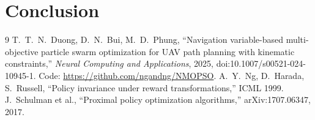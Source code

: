 \documentclass[conference]{IEEEtran}
\begin{document}
\section{Conclusion}

\begin{thebibliography}{9}
 T.~T.~N.~Duong, D.~N.~Bui, M.~D.~Phung, ``Navigation variable-based multi-objective particle
swarm optimization for UAV path planning with kinematic constraints,'' \emph{Neural Computing and
Applications}, 2025, doi:10.1007/s00521-024-10945-1. Code: \url{https://github.com/ngandng/NMOPSO}.
 A.~Y.~Ng, D.~Harada, S.~Russell, ``Policy invariance under reward transformations,'' ICML 1999.
 J.~Schulman et al., ``Proximal policy optimization algorithms,'' arXiv:1707.06347, 2017.
\end{thebibliography}
\end{document}
